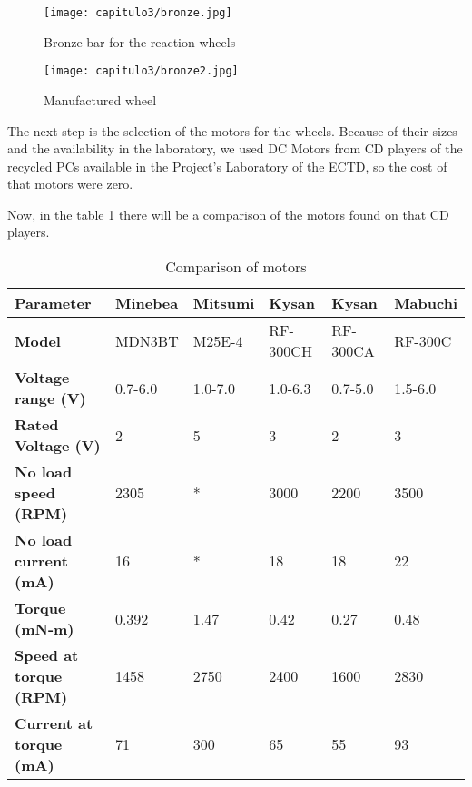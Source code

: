 \begin{figure}[H]
	\centering
		\texttt{[image: capitulo3/bronze.jpg]}
	\caption{Bronze bar for the reaction wheels}
	\label{fig:bronze}
\end{figure}


\begin{figure}[H]
	\centering
		\texttt{[image: capitulo3/bronze2.jpg]}
	\caption{Manufactured wheel}
	\label{fig:bronze2}
\end{figure}


The next step is the selection of the motors for the wheels.  Because of their sizes and the availability in the laboratory, we used \acrshort{DC} Motors from \acrshort{CD} players of the recycled \acrshort{PC}s available in the Project's Laboratory of the \acrshort{ECTD}, so the cost of that motors were zero.

Now, in the table \ref{tab:motors} there will be a comparison of the motors found on that \acrshort{CD} players.

\begin{flushleft}
\begin{table}[H]
\begin{tabular}{ | l | l | l | l | l | l | }
\hline\hline
	\textbf{Parameter} & \textbf{Minebea} & \textbf{Mitsumi} & \textbf{Kysan} & \textbf{Kysan} & \textbf{Mabuchi} \\ \hline
	\textbf{Model} & MDN3BT& M25E-4 & RF-300CH & RF-300CA & RF-300C \\ \hline
	\textbf{Voltage range (V)} & 0.7-6.0 & 1.0-7.0 & 1.0-6.3 & 0.7-5.0 & 1.5-6.0 \\ \hline
	\textbf{Rated Voltage (V) }& 2 & 5 & 3 & 2 & 3 \\ \hline
	\textbf{No load speed (RPM)} & 2305 & * & 3000 & 2200 & 3500 \\ \hline
	\textbf{No load current (mA)} & 16 & * & 18 & 18 & 22 \\ \hline
	\textbf{Torque (mN-m)} & 0.392 & 1.47 & 0.42 & 0.27 & 0.48 \\ \hline
	\textbf{Speed at torque (RPM)} & 1458 & 2750 & 2400 & 1600 & 2830 \\ \hline
	\textbf{Current  at torque (mA)} & 71 & 300 & 65 & 55 & 93 \\ \hline\hline
\end{tabular}
\caption{Comparison of motors \cite{Minebea}\cite{Kysan}\cite{Mitsumi}\cite{Mabuchi}}\label{tab:motors}
\end{table}
\end{flushleft}

